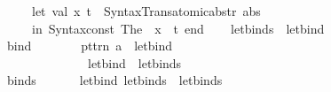 \begin{isabellebody}
\ \ \ \ \ \ let\ val\ {\isacharparenleft}{\kern0pt}x{\isacharcomma}{\kern0pt}\ t{\isacharparenright}{\kern0pt}\ {\isacharequal}{\kern0pt}\ Syntax{\isacharunderscore}{\kern0pt}Trans{\isachardot}{\kern0pt}atomic{\isacharunderscore}{\kern0pt}abs{\isacharunderscore}{\kern0pt}tr{\isacharprime}{\kern0pt}\ abs\isanewline
\ \ \ \ \ \ in\ Syntax{\isachardot}{\kern0pt}const\ \isactrlsyntaxUNDERSCOREconst {\isasymopen}{\isacharunderscore}{\kern0pt}The{\isasymclose}\ {\isachardollar}{\kern0pt}\ x\ {\isachardollar}{\kern0pt}\ t\ end{\isacharparenright}{\kern0pt}{\isacharbrackright}{\kern0pt}\isanewline
{\isacartoucheclose}\ \ %
%
\endisatagML
{\isafoldML}%
%
\isadelimML
\isanewline
%
\endisadelimML
\isanewline
{}\isamarkupfalse%
\ letbinds\ \ letbind\isanewline
{}\isamarkupfalse%
\isanewline
\ \ {\isachardoublequoteopen}{\isacharunderscore}{\kern0pt}bind{\isachardoublequoteclose}\ \ \ \ \ \ \ {\isacharcolon}{\kern0pt}{\isacharcolon}{\kern0pt}\ {\isachardoublequoteopen}{\isacharbrackleft}{\kern0pt}pttrn{\isacharcomma}{\kern0pt}\ {\isacharprime}{\kern0pt}a{\isacharbrackright}{\kern0pt}\ {\isasymRightarrow}\ letbind{\isachardoublequoteclose}\ \ \ \ \ \ \ \ \ \ \ \ \ \ {\isacharparenleft}{\kern0pt}{\isachardoublequoteopen}{\isacharparenleft}{\kern0pt}{}{\isacharunderscore}{\kern0pt}\ {\isacharequal}{\kern0pt}{\isacharslash}{\kern0pt}\ {\isacharunderscore}{\kern0pt}{\isacharparenright}{\kern0pt}{\isachardoublequoteclose}\ {}{}{\isacharparenright}{\kern0pt}\isanewline
\ \ {\isachardoublequoteopen}{\isachardoublequoteclose}\ \ \ \ \ \ \ \ \ \ \ \ {\isacharcolon}{\kern0pt}{\isacharcolon}{\kern0pt}\ {\isachardoublequoteopen}letbind\ {\isasymRightarrow}\ letbinds{\isachardoublequoteclose}\ \ \ \ \ \ \ \ \ \ \ \ \ \ \ \ \ {\isacharparenleft}{\kern0pt}{\isachardoublequoteopen}{\isacharunderscore}{\kern0pt}{\isachardoublequoteclose}{\isacharparenright}{\kern0pt}\isanewline
\ \ {\isachardoublequoteopen}{\isacharunderscore}{\kern0pt}binds{\isachardoublequoteclose}\ \ \ \ \ \ {\isacharcolon}{\kern0pt}{\isacharcolon}{\kern0pt}\ {\isachardoublequoteopen}{\isacharbrackleft}{\kern0pt}letbind{\isacharcomma}{\kern0pt}\ letbinds{\isacharbrackright}{\kern0pt}\ {\isasymRightarrow}\ letbinds{\isachardoublequoteclose}\ \ \ \ \ {\isacharparenleft}{\kern0pt}{\isachardoublequoteopen}{\isacharunderscore}{\kern0pt}{\isacharsemicolon}{\kern0pt}{\isacharslash}{\kern0pt}\ {\isacharunderscore}{\kern0pt}{\isachardoublequoteclose}{\isacharparenright}{\kern0pt}\isanewline

\end{isabellebody}
